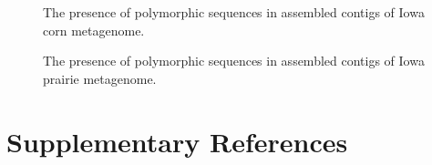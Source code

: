 \documentclass[11pt]{article} %
\begin{document}
\begin{figure}[ht]
\caption{The presence of polymorphic sequences in assembled contigs of
  Iowa corn metagenome.}
\label{corn-poly}
\end{figure}

\begin{figure}[ht]
\caption{The presence of polymorphic sequences in assembled contigs of
  Iowa prairie metagenome.}
\label{prairie-poly}
\end{figure}

\clearpage

\section*{Supplementary References}

\end{document}
